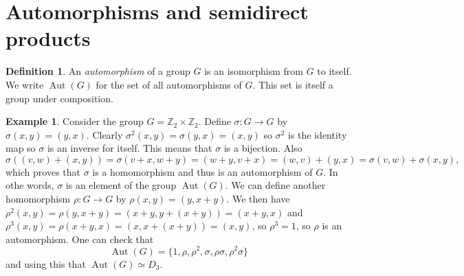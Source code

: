 \documentclass{amsart}
\DeclareMathOperator{\Aut}      {Aut}
\newcommand{\Z}         {{\mathbb{Z}}}
\newcommand{\tm}        {\times}
\newcommand{\xra}       {\xrightarrow}
\newcommand{\sg}        {\sigma}
\renewcommand{\:}{\colon}
\theoremstyle{definition}
\newtheorem{definition}[theorem]{Definition}
\newtheorem{example}[theorem]{Example}
\begin{document}
\section{Automorphisms and semidirect products}

\begin{definition}
 An \emph{automorphism} of a group $G$ is an isomorphism from $G$ to
 itself.  We write $\Aut(G)$ for the set of all automorphisms of $G$.
 This set is itself a group under composition.
\end{definition}

\begin{example}
 Consider the group $G=\Z_2\tm\Z_2$.  Define $\sg\:G\xra{}G$ by
 $\sg(x,y)=(y,x)$.  Clearly $\sg^2(x,y)=\sg(y,x)=(x,y)$ so $\sg^2$ is
 the identity map so $\sg$ is an inverse for itself.  This means that
 $\sg$ is a bijection.  Also 
 \[ \sg((v,w)+(x,y)) = \sg(v+x,w+y)=(w+y,v+x)=
       (w,v)+(y,x)=\sg(v,w)+\sg(x,y),
 \]
 which proves that $\sg$ is a homomorphism and thus is an automorphism
 of $G$.  In othe words, $\sg$ is an element of the group $\Aut(G)$.
 We can define another homomorphism $\rho\:G\xra{}G$ by
 $\rho(x,y)=(y,x+y)$.  We then have
 $\rho^2(x,y)=\rho(y,x+y)=(x+y,y+(x+y))=(x+y,x)$ and
 $\rho^3(x,y)=\rho(x+y,x)=(x,x+(x+y))=(x,y)$, so $\rho^3=1$, so $\rho$
 is an automorphism.  One can check that 
 \[ \Aut(G) = \{1,\rho,\rho^2,\sg,\rho\sg,\rho^2\sg\} \]
 and using this that $\Aut(G)\simeq D_3$.
\end{example}
\end{document}
